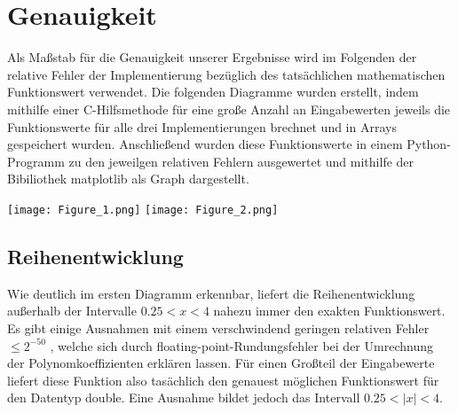 \documentclass[course=erap] {aspdoc}
\begin{document}
    \section{Genauigkeit}
    Als Maßstab für die Genauigkeit unserer Ergebnisse wird im Folgenden der relative Fehler der Implementierung bezüglich des tatsächlichen mathematischen Funktionswert verwendet. Die folgenden Diagramme wurden erstellt, indem mithilfe einer C-Hilfsmethode für eine große Anzahl an Eingabewerten jeweils die Funktionswerte für alle drei Implementierungen brechnet und in Arrays gespeichert wurden. Anschließend wurden diese Funktionswerte in einem Python-Programm zu den jeweilgen relativen Fehlern ausgewertet und mithilfe der Bibiliothek matplotlib als Graph dargestellt.

    \texttt{[image: Figure\_1.png]}
    \texttt{[image: Figure\_2.png]}
    
    \subsection{Reihenentwicklung}
    Wie deutlich im ersten Diagramm erkennbar, liefert die Reihenentwicklung außerhalb der Intervalle $0.25<x<4$ nahezu immer den exakten Funktionswert. Es gibt einige Ausnahmen mit einem verschwindend geringen relativen Fehler $\leq2^{-50}$ , welche sich durch floating-point-Rundungsfehler bei der Umrechnung der Polynomkoeffizienten erklären lassen.
    Für einen Großteil der Eingabewerte liefert diese Funktion also tasächlich den genauest möglichen Funktionswert für den Datentyp double. Eine Ausnahme bildet jedoch das Intervall $0.25<|x|<4$. 
    
\end{document}
